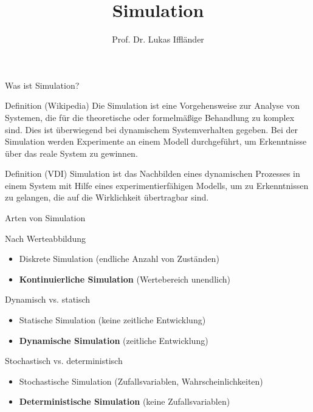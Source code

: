 \documentclass[xelatex,aspectratio=169]{beamer}
\title{Simulation}
\author{Prof. Dr. Lukas Iffländer}
\institute{HTW Dresden}
\date{}
\begin{document}
\begin{frame}
    \titlepage
\end{frame}

\begin{frame}{Was ist Simulation?}
    \begin{block}{Definition (Wikipedia)}
        Die Simulation ist eine Vorgehensweise zur Analyse von Systemen, die für die theoretische oder formelmäßige Behandlung zu komplex sind. Dies ist überwiegend bei dynamischem Systemverhalten gegeben. Bei der Simulation werden Experimente an einem Modell durchgeführt, um Erkenntnisse über das reale System zu gewinnen.
    \end{block}
    \begin{block}{Definition (VDI)}
        Simulation ist das Nachbilden eines dynamischen Prozesses in einem System mit Hilfe eines experimentierfähigen Modells, um zu Erkenntnissen zu gelangen, die auf die Wirklichkeit übertragbar sind.
    \end{block}

\end{frame}

\begin{frame}{Arten von Simulation}
    \begin{block}{Nach Werteabbildung}
        \begin{itemize}
            \item Diskrete Simulation (endliche Anzahl von Zuständen)
            \item \textbf{Kontinuierliche Simulation} (Wertebereich unendlich)
        \end{itemize}
    \end{block}
    \begin{block}{Dynamisch vs. statisch}
        \begin{itemize}
            \item Statische Simulation (keine zeitliche Entwicklung)
            \item \textbf{Dynamische Simulation} (zeitliche Entwicklung)
        \end{itemize}
    \end{block}
    \begin{block}{Stochastisch vs. deterministisch}
        \begin{itemize}
            \item Stochastische Simulation (Zufallsvariablen, Wahrscheinlichkeiten)
            \item \textbf{Deterministische Simulation} (keine Zufallsvariablen)
        \end{itemize}
    \end{block}

\end{frame}
\end{document}
